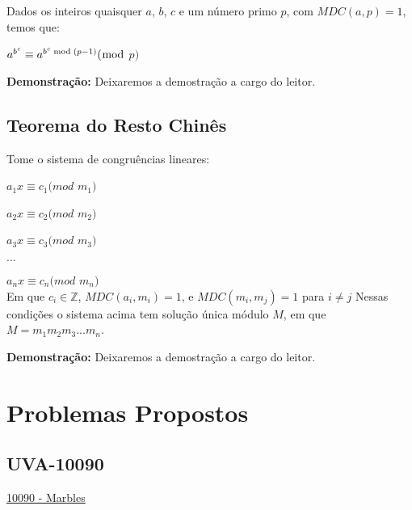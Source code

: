\begin{theorem}\label{teorema_fermat_expansao}
Dados os inteiros quaisquer $a$, $b$, $c$ e um número primo $p$, com $MDC(a, p) = 1$, temos que:

$a^{b^c} \equiv a^{b^c \bmod (p-1)} (\bmod$ $p)$

\end{theorem}

\textbf{Demonstração:}
Deixaremos a demostração a cargo do leitor.


\subsection{Teorema do Resto Chinês}

\begin{theorem}
Tome o sistema de congruências lineares:

$a_1x \equiv c_1 (mod$ $m_1)$

$a_2x \equiv c_2 (mod$ $m_2)$

$a_3x \equiv c_3 (mod$ $m_3)$

$...$

$a_nx \equiv c_n (mod$ $m_n)$\\

Em que $c_i \in \mathbb{Z}$, $MDC(a_i,m_i) = 1$, e $MDC(m_i, m_j) = 1$ para $i \neq j$
Nessas condições o sistema acima tem solução única módulo $M$, em que $M = m_1m_2m_3...m_n$.
\end{theorem}
\textbf{Demonstração:}
Deixaremos a demostração a cargo do leitor.


\section{Problemas Propostos}



\subsection{UVA-10090}
\href{https://uva.onlinejudge.org/index.php?option=onlinejudge&page=show_problem&problem=1031}{10090 - Marbles}\\


